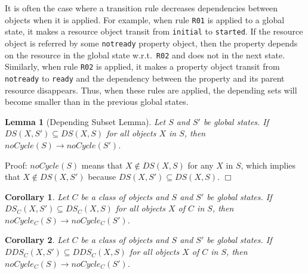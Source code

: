 \documentclass[12pt]{report}
\newtheorem{lemma}{Lemma}
\newtheorem{corollary}{Corollary}
\newcommand{\ra}{\rightarrow}
\begin{document}
It is often the case where a transition rule decreases dependencies
between objects when it is applied. For example, when rule {\tt R01}
is applied to a global state, it makes a resource object transit from
{\tt initial} to {\tt started}. If the resource object is referred by
some {\tt notready} property object, then the property depends on the
resource in the global state w.r.t.\ {\tt R02} and does not in the
next state. Similarly, when rule {\tt R02} is applied, it makes a
property object transit from {\tt notready} to {\tt ready} and the
dependency between the property and its parent resource disappears.
Thus, when these rules are applied, the depending sets will become
smaller than in the previous global states.

\begin{lemma}[Depending Subset Lemma]
Let $S$ and $S'$ be global states.  If $DS(X,S')\subseteq DS(X,S)$ for all
objects $X$ in $S$, then $noCycle(S) \ra noCycle(S')$.
\end{lemma}
Proof: $noCycle(S)$ means that $X\not\in DS(X,S)$ for any $X$ in $S$,
which implies that $X\not\in DS(X,S')$ because $DS(X,S')\subseteq
DS(X,S)$.  $\Box$

\begin{corollary}
Let $C$ be a class of objects and $S$ and $S'$ be global states.  If
$DS_C(X,S')\subseteq DS_C(X,S)$ for all objects $X$ of $C$ in $S$,
then $noCycle_C(S) \ra noCycle_C(S')$.
\end{corollary}

\begin{corollary}
Let $C$ be a class of objects and $S$ and $S'$ be global states.  If
$DDS_C(X,S')\subseteq DDS_C(X,S)$ for all objects $X$ of $C$ in $S$,
then $noCycle_C(S) \ra noCycle_C(S')$.
\end{corollary}
\end{document}
